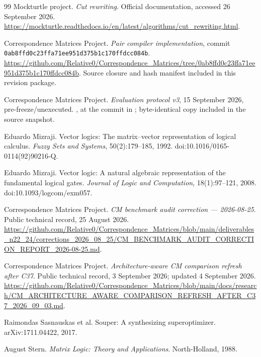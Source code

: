 \documentclass[10pt]{article}
\theoremstyle{plain}
\theoremstyle{definition}
\theoremstyle{remark}
\begin{document}
\begin{thebibliography}{99}
Mockturtle project.
\newblock \emph{Cut rewriting}.
\newblock Official documentation, accessed 26 September 2026.
\newblock \url{https://mockturtle.readthedocs.io/en/latest/algorithms/cut_rewriting.html}.

Correspondence Matrices Project.
\newblock \emph{Pair compiler implementation}, commit \texttt{0ab8ffd0c23ffa71ee951d375b1c170ffdcc084b}.
\newblock \url{https://github.com/Relative0/Correspondence_Matrices/tree/0ab8ffd0c23ffa71ee951d375b1c170ffdcc084b}.
\newblock Source closure and hash manifest included in this revision package.

Correspondence Matrices Project.
\newblock \emph{Evaluation protocol v3}, 15 September 2026, pre-freeze/unexecuted.
\newblock {}, at the commit in \cite{CompilerSnapshot2026}; byte-identical copy included in the source snapshot.

Eduardo Mizraji.
\newblock Vector logics: The matrix--vector representation of logical calculus.
\newblock \emph{Fuzzy Sets and Systems}, 50(2):179--185, 1992.
\newblock doi:10.1016/0165-0114(92)90216-Q.

Eduardo Mizraji.
\newblock Vector logic: A natural algebraic representation of the fundamental logical gates.
\newblock \emph{Journal of Logic and Computation}, 18(1):97--121, 2008.
\newblock doi:10.1093/logcom/exm057.

Correspondence Matrices Project.
\newblock \emph{CM benchmark audit correction --- 2026-08-25}.
\newblock Public technical record, 25 August 2026.
\newblock \url{https://github.com/Relative0/Correspondence_Matrices/blob/main/deliverables_n22_24/corrections_2026_08_25/CM_BENCHMARK_AUDIT_CORRECTION_REPORT_2026-08-25.md}.

Correspondence Matrices Project.
\newblock \emph{Architecture-aware CM comparison refresh after C37}.
\newblock Public technical record, 3 September 2026; updated 4 September 2026.
\newblock \url{https://github.com/Relative0/Correspondence_Matrices/blob/main/docs/research/CM_ARCHITECTURE_AWARE_COMPARISON_REFRESH_AFTER_C37_2026_09_03.md}.

Raimondas Sasnauskas et al.
\newblock Souper: A synthesizing superoptimizer.
\newblock arXiv:1711.04422, 2017.

August Stern.
\newblock \emph{Matrix Logic: Theory and Applications}.
\newblock North-Holland, 1988.


\end{thebibliography}
\end{document}
